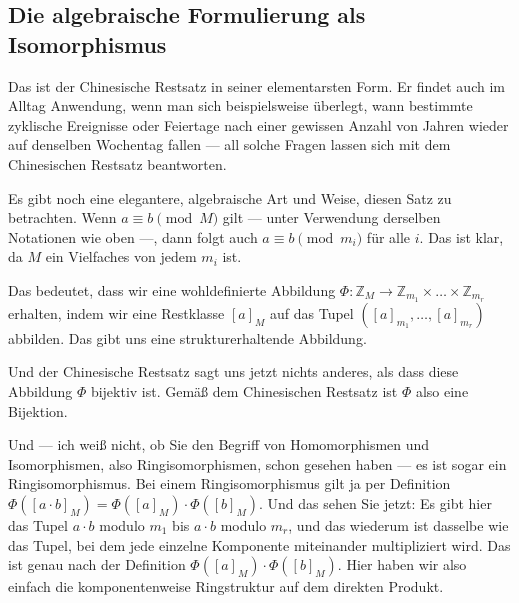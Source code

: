 \subsection{Die algebraische Formulierung als Isomorphismus}

\begin{spoken-clean}[01:15:55 - 01:18:12]
Das ist der Chinesische Restsatz in seiner elementarsten Form. Er findet auch im Alltag Anwendung, wenn man sich beispielsweise überlegt, wann bestimmte zyklische Ereignisse oder Feiertage nach einer gewissen Anzahl von Jahren wieder auf denselben Wochentag fallen --- all solche Fragen lassen sich mit dem Chinesischen Restsatz beantworten.

Es gibt noch eine elegantere, algebraische Art und Weise, diesen Satz zu betrachten. Wenn $a \equiv b \pmod M$ gilt --- unter Verwendung derselben Notationen wie oben ---, dann folgt auch $a \equiv b \pmod{m_i}$ für alle $i$. Das ist klar, da $M$ ein Vielfaches von jedem $m_i$ ist.

Das bedeutet, dass wir eine wohldefinierte Abbildung $\Phi \colon \mathbb{Z}_M \to \mathbb{Z}_{m_1} \times \dots \times \mathbb{Z}_{m_r}$ erhalten, indem wir eine Restklasse $[a]_M$ auf das Tupel $([a]_{m_1}, \dots, [a]_{m_r})$ abbilden. Das gibt uns eine strukturerhaltende Abbildung.
\end{spoken-clean}

\begin{spoken-clean}[01:18:12 - 01:19:22]
Und der Chinesische Restsatz sagt uns jetzt nichts anderes, als dass diese Abbildung $\Phi$ bijektiv ist. Gemäß dem Chinesischen Restsatz ist $\Phi$ also eine Bijektion.

Und --- ich weiß nicht, ob Sie den Begriff von Homomorphismen und Isomorphismen, also Ringisomorphismen, schon gesehen haben --- es ist sogar ein Ringisomorphismus. Bei einem Ringisomorphismus gilt ja per Definition $\Phi([a \cdot b]_M) = \Phi([a]_M) \cdot \Phi([b]_M)$. Und das sehen Sie jetzt: Es gibt hier das Tupel $a \cdot b$ modulo $m_1$ bis $a \cdot b$ modulo $m_r$, und das wiederum ist dasselbe wie das Tupel, bei dem jede einzelne Komponente miteinander multipliziert wird. Das ist genau nach der Definition $\Phi([a]_M) \cdot \Phi([b]_M)$. Hier haben wir also einfach die komponentenweise Ringstruktur auf dem direkten Produkt.
\end{spoken-clean}


